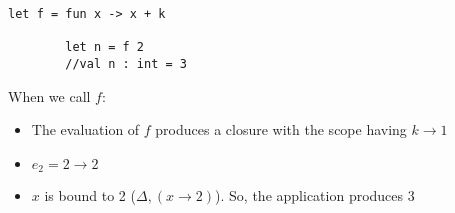 \begin{itemize}
\begin{lstlisting}[style=FSharpStyle]
        let f = fun x -> x + k
                
        let n = f 2
        //val n : int = 3
    \end{lstlisting}
    When we call $f$:
    \begin{itemize}
        \item The evaluation of $f$ produces a closure with the scope having $k\rightarrow 1$
        \item $e_{2}=2 \rightarrow 2$
        \item $x$ is bound to 2 ($\Delta,(x\rightarrow 2)$). So, the application produces 3
    \end{itemize}
\end{itemize}
